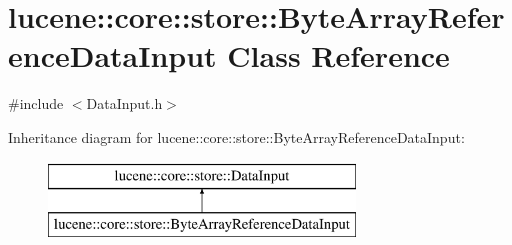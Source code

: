 \hypertarget{classlucene_1_1core_1_1store_1_1ByteArrayReferenceDataInput}{}\section{lucene\+:\+:core\+:\+:store\+:\+:Byte\+Array\+Reference\+Data\+Input Class Reference}
\label{classlucene_1_1core_1_1store_1_1ByteArrayReferenceDataInput}


{\ttfamily \#include $<$Data\+Input.\+h$>$}

Inheritance diagram for lucene\+:\+:core\+:\+:store\+:\+:Byte\+Array\+Reference\+Data\+Input\+:\begin{figure}[H]
\begin{center}
\leavevmode
\includegraphics[height=2.000000cm]{classlucene_1_1core_1_1store_1_1ByteArrayReferenceDataInput}
\end{center}
\end{figure}
